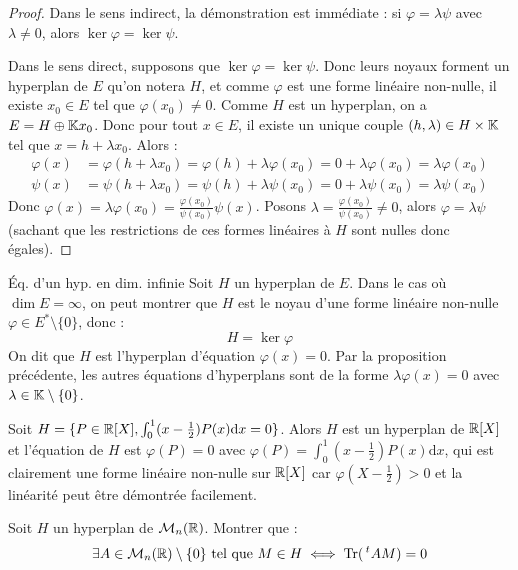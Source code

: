 \documentclass[11pt,a4paper]{report}
\begin{document}
\begin{proof}
    Dans le sens indirect, la démonstration est immédiate : si $\varphi = \lambda \psi$ avec $\lambda \ne 0$, alors $\ker\varphi = \ker\psi$.

    Dans le sens direct, supposons que $\ker\varphi = \ker\psi$. Donc leurs noyaux forment un hyperplan de $E$ qu'on notera $H$, et comme $\varphi$ est une forme linéaire non-nulle, il existe $x_0 \in E$ tel que $\varphi(x_0) \ne 0$. Comme $H$ est un hyperplan, on a $E = H \oplus \mathbb{K} x_0$. Donc pour tout $x \in E$, il existe un unique couple $(h, \lambda) \in H \times \mathbb{K}$ tel que $x = h + \lambda x_0$. Alors :
    \begin{align*}
        \varphi(x) &= \varphi(h + \lambda x_0) = \varphi(h) + \lambda \varphi(x_0) = 0 + \lambda \varphi(x_0) = \lambda \varphi(x_0) \\
        \psi(x) &= \psi(h + \lambda x_0) = \psi(h) + \lambda \psi(x_0) = 0 + \lambda \psi(x_0) = \lambda \psi(x_0)
    \end{align*}
    Donc $\varphi(x) = \lambda \varphi(x_0) = \frac{\varphi(x_0)}{\psi(x_0)} \psi(x)$. Posons $\lambda = \frac{\varphi(x_0)}{\psi(x_0)} \ne 0$, alors $\varphi = \lambda \psi$ (sachant que les restrictions de ces formes linéaires à $H$ sont nulles donc égales).
\end{proof}

\begin{customenv}{}{Éq. d'un hyp. en dim. infinie}
    Soit $H$ un hyperplan de $E$. Dans le cas où $\dim E = \infty$, on peut montrer que $H$ est le noyau d'une forme linéaire non-nulle $\varphi \in E^* \setminus \{0\}$, donc :
    $$H = \ker\varphi$$
    On dit que $H$ est l'hyperplan d'équation $\varphi(x) = 0$. Par la proposition précédente, les autres équations d'hyperplans sont de la forme $\lambda \varphi(x) = 0$ avec $\lambda \in \mathbb{K}\setminus\{0\}$.
\end{customenv}

\begin{example}
    Soit $H = \{P \in \mathbb{R}[X] , \int_0^1 (x-\frac12) P(x) \mathrm dx = 0\}$. Alors $H$ est un hyperplan de $\mathbb{R}[X]$ et l'équation de $H$ est $\varphi(P) = 0$ avec $\varphi(P) = \int_0^1 (x-\frac12) P(x) \mathrm dx$, qui est clairement une forme linéaire non-nulle sur $\mathbb{R}[X]$ car $\varphi(X-\frac12) > 0$ et la linéarité peut être démontrée facilement.
\end{example}

\begin{exercise}
    Soit $H$ un hyperplan de $\mathcal M_n(\mathbb{R})$. Montrer que :
    $$\exists A \in \mathcal M_n(\mathbb{R}) \setminus \{0\} \text{ tel que } M \in H \iff \mathrm{Tr}(\,^tAM) = 0$$
\end{exercise}
\end{document}
